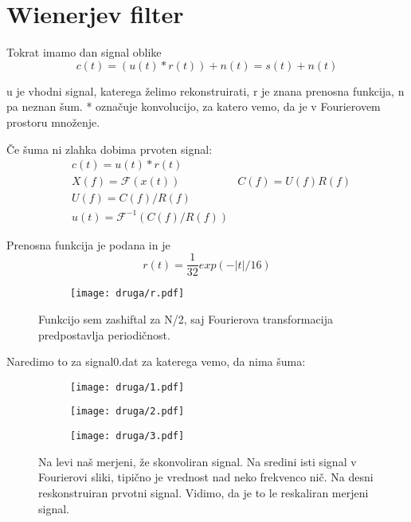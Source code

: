 \documentclass{article}
\begin{document}
\section{Wienerjev filter}
Tokrat imamo dan signal oblike
\begin{equation*}
c(t) = (u(t)*r(t)) + n(t)  = s(t) + n(t)
\end{equation*}

u je vhodni signal, katerega želimo rekonstruirati, r je znana prenosna funkcija, n pa neznan šum. * označuje konvolucijo, za katero vemo, da je v Fourierovem prostoru množenje.

Če šuma ni zlahka dobima prvoten signal:
\begin{align*}
&c(t) = u(t)*r(t) \\
&X(f) = \mathscr{F} \left(x(t)\right)
&C(f) = U(f)R(f) \\
&U(f) = C(f)/R(f) \\
&u(t) = \mathscr{F}^{-1}\left(C(f)/R(f)\right)
\end{align*}

Prenosna funkcija je podana in je
\begin{equation*}
r(t) = \frac{1}{32} exp(-|t|/16)
\end{equation*}

\begin{figure}[H]
\centering
\begin{subfigure}{.6\textwidth}
\texttt{[image: druga/r.pdf]}
\end{subfigure}
\caption*{Funkcijo sem zashiftal za N/2, saj Fourierova transformacija predpostavlja periodičnost.}
\end{figure}

Naredimo to za signal0.dat za katerega vemo, da nima šuma:

\begin{figure}[H]
\centering
\begin{subfigure}{.3\textwidth}
\texttt{[image: druga/1.pdf]}
\end{subfigure}
\begin{subfigure}{.3\textwidth}
\texttt{[image: druga/2.pdf]}
\end{subfigure}
\begin{subfigure}{.3\textwidth}
\texttt{[image: druga/3.pdf]}
\end{subfigure}
\caption*{Na levi naš merjeni, že skonvoliran signal. Na sredini isti signal v Fourierovi sliki, tipično je vrednost nad neko frekvenco nič. Na desni reskonstruiran prvotni signal. Vidimo, da je to le reskaliran merjeni signal.}
\end{figure}
\end{document}
